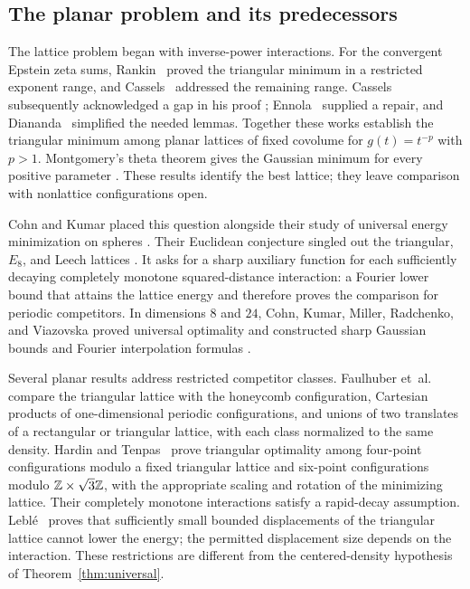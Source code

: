 \subsection{The planar problem and its predecessors}

The lattice problem began with inverse-power interactions.  For the
convergent Epstein zeta sums, Rankin~\citep{Rankin1953} proved the triangular
minimum in a restricted exponent range, and Cassels~\citep{Cassels1959} addressed
the remaining range.  Cassels subsequently acknowledged a gap in his proof
\citep{Cassels1963Corrigendum}; Ennola~\citep{Ennola1964Lemma} supplied a repair,
and Diananda~\citep{Diananda1964} simplified the needed lemmas.  Together these works
establish the triangular minimum among planar lattices of fixed covolume
for $g(t)=t^{-p}$ with $p>1$.  Montgomery's theta theorem gives the
Gaussian minimum for every positive parameter
\citep[Theorem~1]{Montgomery1988}.  These results identify the best lattice;
they leave comparison with nonlattice configurations open.

Cohn and Kumar placed this question alongside their study of universal
energy minimization on spheres
\citep[Theorem~1.2]{CohnKumar2007}.  Their Euclidean conjecture singled out
the triangular, $E_8$, and Leech lattices
\citep[Conjecture~9.4]{CohnKumar2007}.  It asks for a sharp auxiliary function
for each sufficiently decaying completely monotone squared-distance
interaction: a Fourier lower bound that attains the lattice energy and
therefore proves the comparison for periodic competitors.  In dimensions
$8$ and $24$, Cohn, Kumar, Miller, Radchenko, and Viazovska proved universal
optimality and constructed sharp Gaussian bounds and Fourier interpolation
formulas \citep[Theorems~1.4, 1.7, and 1.9]{CKMRV2022}.

Several planar results address restricted competitor classes.
Faulhuber et~al.~\citep[Theorem~1.1 and Corollary~1.3]{FaulhuberShafkulovskaZlotnikov2023}
compare the triangular lattice with the honeycomb configuration,
Cartesian products of one-dimensional periodic configurations, and unions
of two translates of a rectangular or triangular lattice, with each class
normalized to the same density.
Hardin and Tenpas~\citep[Theorem~1]{HardinTenpas2025} prove triangular optimality among
four-point configurations modulo a fixed triangular lattice and six-point
configurations modulo $\mathbb Z\times\sqrt3\mathbb Z$, with the appropriate scaling
and rotation of the minimizing lattice.  Their completely monotone
interactions satisfy a rapid-decay assumption.
Lebl\'e~\citep[Theorems~1--2]{Leble2025} proves that sufficiently small bounded
displacements of the triangular lattice cannot lower the energy; the
permitted displacement size depends on the interaction.
These restrictions are different from the centered-density hypothesis of
Theorem~\ref{thm:universal}.

